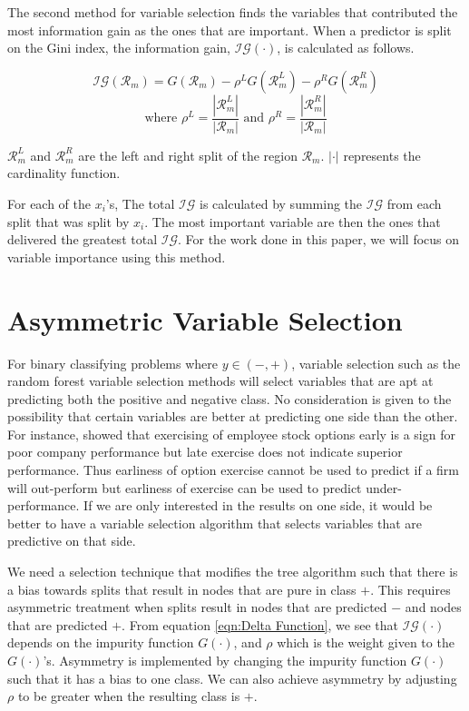 \documentclass[twoside,11pt]{article}
\begin{document}
The second method for variable selection finds the variables that contributed the most information gain as the ones that are important. When a predictor is split on the Gini index, the information gain, $\mathcal{IG}(\cdot)$, is calculated as follows. 

\begin{equation}\label{eqn:Delta Function}
	\mathcal{IG}(\mathcal{R}_m)=G(\mathcal{R}_m)-\rho^L G(\mathcal{R}_m^L)-\rho^R G(\mathcal{R}_m^R) 
\end{equation}
\begin{equation}
	\text{where } \rho^L = \frac{|\mathcal{R}_m^L|}{|\mathcal{R}_m|} \text{ and } \rho^R = \frac{|\mathcal{R}_m^R|}{|\mathcal{R}_m|}
\end{equation}
	
$\mathcal{R}_m^L$ and $\mathcal{R}_m^R$ are the left and right split of the region $\mathcal{R}_m$. $|\cdot|$ represents the cardinality function. 

For each of the $x_i$'s, The total $\mathcal{IG}$ is calculated by summing the $\mathcal{IG}$ from each split that was split by $x_i$. The most important variable are then the ones that delivered the greatest total $\mathcal{IG}$. For the work done in this paper, we will focus on variable importance using this method. 	

\section{Asymmetric Variable Selection}
For binary classifying problems where $y\in (-,+)$, variable selection such as the random forest variable selection methods will select variables that are apt at predicting both the positive and negative class. No consideration is given to the possibility that certain variables are better at predicting one side than the other. For instance, \cite{Bettis05} showed that exercising of employee stock options early is a sign for poor company performance but late exercise does not indicate superior performance. Thus earliness of option exercise cannot be used to predict if a firm will out-perform but earliness of exercise can be used to predict under-performance. If we are only interested in the results on one side, it would be better to have a variable selection algorithm that selects variables that are predictive on that side. 

We need a selection technique that modifies the tree algorithm such that there is a bias towards splits that result in nodes that are pure in class $+$. This requires asymmetric treatment when splits result in nodes that are predicted $-$ and nodes that are predicted $+$. From equation \ref{eqn:Delta Function}, we see that $\mathcal{IG}(\cdot)$ depends on the impurity function $G(\cdot)$, and $\rho$ which is the weight given to the $G(\cdot)$'s. Asymmetry is implemented by changing the impurity function $G(\cdot)$ such that it has a bias to one class. We can also achieve asymmetry by adjusting $\rho$ to be greater when the resulting class is $+$. 
\end{document}
